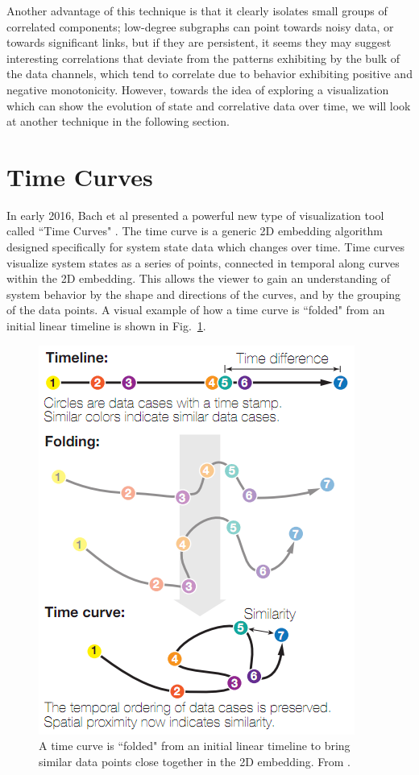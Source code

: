 Another advantage of this technique is that it clearly isolates small groups of correlated components; low-degree subgraphs can point towards noisy data, or towards significant links, but if they are persistent, it seems they may suggest interesting correlations that deviate from the patterns exhibiting by the bulk of the data channels, which tend to correlate due to behavior exhibiting positive and negative monotonicity. However, towards the idea of exploring a visualization which can show the evolution of state and correlative data over time, we will look at another technique in the following section.

\section{Time Curves}

In early 2016, Bach et al presented a powerful new type of visualization tool called ``Time Curves" \cite{bach2016time}. The time curve is a generic 2D embedding algorithm designed specifically for system state data which changes over time. Time curves visualize system states as a series of points, connected in temporal along curves within the 2D embedding. This allows the viewer to gain an understanding of system behavior by the shape and directions of the curves, and by the grouping of the data points. A visual example of how a time curve is ``folded" from an initial linear timeline is shown in Fig.~\ref{fig:time_curve_example}.

\begin{figure}[h]
\centering
    \includegraphics[width=0.5\columnwidth]{images/time_curve_example.png}
    \caption{A time curve is ``folded" from an initial linear timeline to bring similar data points close together in the 2D embedding. From \cite{bach2016time}.}
    \label{fig:time_curve_example}
\end{figure}


\subsection{}

\subsection{}

\subsection{}

\subsection{}



